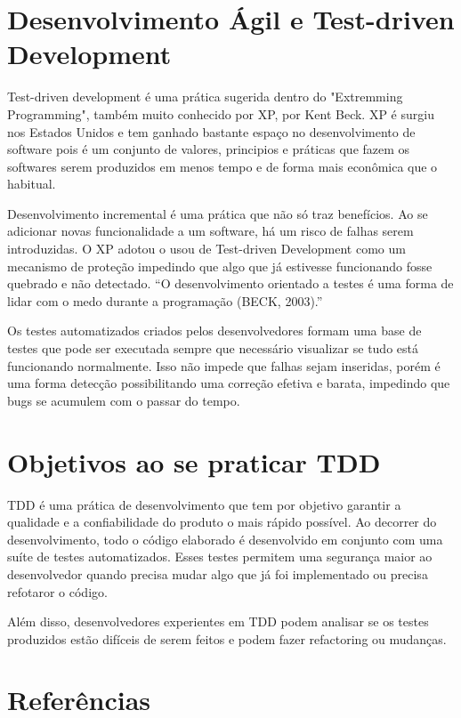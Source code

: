 \documentclass{article}
\begin{document}
  \section{Desenvolvimento Ágil e Test-driven Development}

  Test-driven development é uma prática sugerida dentro do "Extremming 
  Programming", também muito conhecido por XP, por Kent Beck. XP é surgiu nos
  Estados Unidos e tem ganhado bastante espaço no desenvolvimento de software
  pois é um conjunto de valores, principios e práticas que fazem os softwares 
  serem produzidos em menos tempo e de forma mais econômica que o habitual.

  Desenvolvimento incremental é uma prática que não só traz benefícios. Ao se
  adicionar novas funcionalidade a um software, há um risco de falhas serem 
  introduzidas. O XP adotou o usou de Test-driven Development como um mecanismo
  de proteção impedindo que algo que já estivesse funcionando fosse quebrado
  e não detectado. “O desenvolvimento orientado a testes é uma forma de lidar 
  com o medo durante a programação (BECK, 2003).”

  Os testes automatizados criados pelos desenvolvedores formam uma base de 
  testes que pode ser executada sempre que necessário visualizar se tudo está
  funcionando normalmente. Isso não impede que falhas sejam inseridas, porém
  é uma forma detecção possibilitando uma correção efetiva e barata, impedindo
  que bugs se acumulem com o passar do tempo.

  \section{Objetivos ao se praticar TDD}

  TDD é uma prática de desenvolvimento que tem por objetivo garantir a
  qualidade e a confiabilidade do produto o mais rápido possível. Ao decorrer do
  desenvolvimento, todo o código elaborado é desenvolvido em conjunto com uma
  suíte de testes automatizados. Esses testes permitem uma segurança maior ao
  desenvolvedor quando precisa mudar algo que já foi implementado ou precisa 
  refotaror o código.

  Além disso, desenvolvedores experientes em TDD podem analisar se os testes 
  produzidos estão difíceis de serem feitos e podem fazer refactoring ou 
  mudanças.



  \section{Referências}
\end{document}
